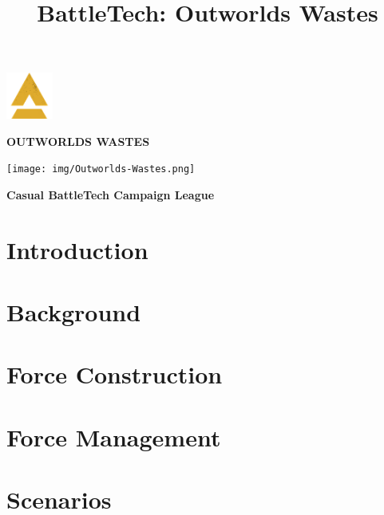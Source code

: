 \documentclass{article}
\title{BattleTech: Outworlds Wastes}
\author{}
\date{}
\newcommand{\mysectiontitle}{}
\newcommand{\newsection}[2]{\renewcommand{\mysectiontitle}{#2}\section{#1}}
\begin{document}
\makeatletter
{}

\begin{center}
  \mbox{\fontsize{50}{60}\bfseries{}\includegraphics[alt='a', width=0.6in, height=0.6in]{img/Battletech-A.png}\fontsize{50}{60}\bfseries{}}

  \fontsize{30}{37}\bfseries\selectfont\MakeUppercase{Outworlds Wastes}

  \texttt{[image: img/Outworlds-Wastes.png]}

  \LARGE\bfseries{Casual BattleTech Campaign League}
\end{center}

\newsection{Introduction}{introduction}



\newpage

\newsection{Background}{background}



\newsection{Force Construction}{force-construction}



\newpage

\newsection{Force Management}{force-management}



\newpage

\newsection{Scenarios}{scenarios}
\label{sec:scenarios}
\end{document}
